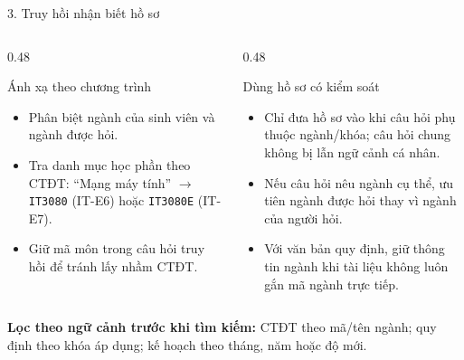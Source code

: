 \documentclass[t, aspectratio=169]{beamer}
\begin{document}
		\begin{frame}{3. Truy hồi nhận biết hồ sơ}
			\begin{columns}[T,onlytextwidth]
				\begin{column}{0.48\textwidth}
					\begin{block}{Ánh xạ theo chương trình}
						\scriptsize
						\begin{itemize}
							\setlength{\itemsep}{0.04cm}
							\item Phân biệt ngành của sinh viên và ngành được hỏi.
							\item Tra danh mục học phần theo CTĐT: ``Mạng máy tính'' $\rightarrow$ \texttt{IT3080} (IT-E6) hoặc \texttt{IT3080E} (IT-E7).
							\item Giữ mã môn trong câu hỏi truy hồi để tránh lấy nhầm CTĐT.
						\end{itemize}
					\end{block}
				\end{column}
				\begin{column}{0.48\textwidth}
					\begin{block}{Dùng hồ sơ có kiểm soát}
						\scriptsize
						\begin{itemize}
							\setlength{\itemsep}{0.04cm}
							\item Chỉ đưa hồ sơ vào khi câu hỏi phụ thuộc ngành/khóa; câu hỏi chung không bị lẫn ngữ cảnh cá nhân.
							\item Nếu câu hỏi nêu ngành cụ thể, ưu tiên ngành được hỏi thay vì ngành của người hỏi.
							\item Với văn bản quy định, giữ thông tin ngành khi tài liệu không luôn gắn mã ngành trực tiếp.
						\end{itemize}
					\end{block}
				\end{column}
			\end{columns}

			\vspace{0.04cm}
			{\color{hustprimary}\bfseries\scriptsize Lọc theo ngữ cảnh trước khi tìm kiếm:}
			{\tiny CTĐT theo mã/tên ngành; quy định theo khóa áp dụng; kế hoạch theo tháng, năm hoặc độ mới.}
		\end{frame}
\end{document}
